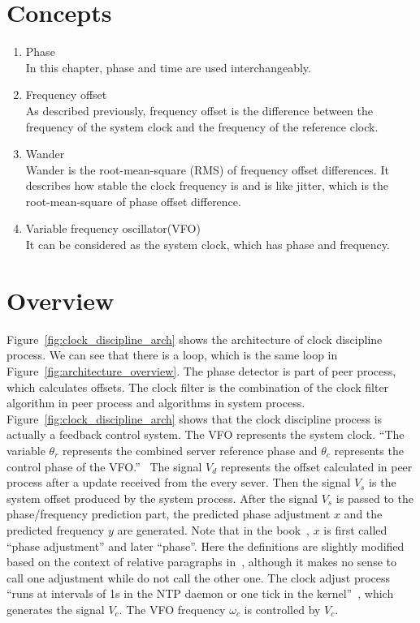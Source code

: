 \section{Concepts}%
\label{sec:clock_discipline_concepts}
\begin{enumerate}
    \item Phase\\
        In this chapter, phase and time are used interchangeably.
    \item Frequency offset\\
        As described previously, frequency offset is the difference between the
        frequency of the system clock and the frequency of the reference clock.
    \item Wander\\
        Wander is the root-mean-square (RMS) of frequency offset differences. 
        It describes how stable the clock frequency is and is like jitter,
        which is the root-mean-square of phase offset difference.
    \item Variable frequency oscillator(VFO)\\
        It can be considered as the system clock, which has phase and
        frequency.
\end{enumerate}

\section{Overview}%
\label{sec:clock_discipline_overview}
Figure~\ref{fig:clock_discipline_arch} shows the architecture of clock
discipline process. We can see that there is a loop, which is the same loop in 
Figure~\ref{fig:architecture_overview}. The phase detector is part of peer
process, which calculates offsets. The clock filter is the combination of
the clock filter algorithm in peer process and algorithms in system process.
Figure~\ref{fig:clock_discipline_arch} shows that the clock discipline process
is actually a feedback control system. The VFO represents the system clock.
``The variable $\theta_r$ represents the combined server reference phase and
$\theta_c$ represents the control phase of the VFO.''~\cite{redbook} The signal
$V_d$ represents the offset calculated in peer process after a update received
from the every sever. Then the signal $V_s$ is the system offset produced by
the system process. After the signal $V_s$ is passed to the phase/frequency
prediction part, the predicted phase adjustment $x$ and the predicted frequency
$y$ are generated. Note that in the book~\cite{redbook}, $x$ is first called
``phase adjustment'' and later ``phase''. Here the definitions are slightly
modified based on the context of relative paragraphs in~\cite{redbook},
although it makes no sense to call one adjustment while do not call the other
one. The clock adjust process ``runs at intervals of 1s in the NTP daemon or
one tick in the kernel''~\cite{redbook}, which generates the signal $V_c$. The
VFO frequency $\omega_c$ is controlled by $V_c$.

